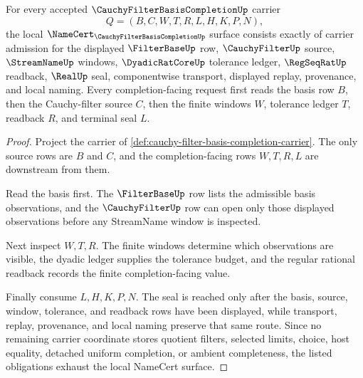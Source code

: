 \begin{theorem}
\label{thm:cauchy-filter-basis-completion-namecert-obligations}
For every accepted $\CauchyFilterBasisCompletionUp$ carrier
$$
Q=(B,C,W,T,R,L,H,K,P,N),
$$
the local $\NameCert_{\CauchyFilterBasisCompletionUp}$ surface consists exactly of carrier admission for the displayed $\FilterBaseUp$ row, $\CauchyFilterUp$ source, $\StreamNameUp$ windows, $\DyadicRatCoreUp$ tolerance ledger, $\RegSeqRatUp$ readback, $\RealUp$ seal, componentwise transport, displayed replay, provenance, and local naming. Every completion-facing request first reads the basis row $B$, then the Cauchy-filter source $C$, then the finite windows $W$, tolerance ledger $T$, readback $R$, and terminal seal $L$.
\end{theorem}
\begin{proof}
Project the carrier of \autoref{def:cauchy-filter-basis-completion-carrier}. The only source rows are $B$ and $C$, and the completion-facing rows $W,T,R,L$ are downstream from them.

Read the basis first. The $\FilterBaseUp$ row lists the admissible basis observations, and the $\CauchyFilterUp$ row can open only those displayed observations before any StreamName window is inspected.

Next inspect $W,T,R$. The finite windows determine which observations are visible, the dyadic ledger supplies the tolerance budget, and the regular rational readback records the finite completion-facing value.

Finally consume $L,H,K,P,N$. The seal is reached only after the basis, source, window, tolerance, and readback rows have been displayed, while transport, replay, provenance, and local naming preserve that same route. Since no remaining carrier coordinate stores quotient filters, selected limits, choice, host equality, detached uniform completion, or ambient completeness, the listed obligations exhaust the local NameCert surface.
\end{proof}

